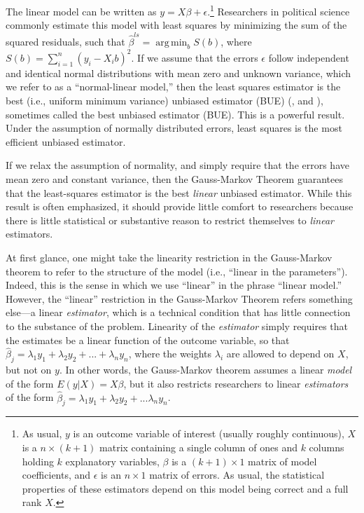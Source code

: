 \documentclass[12pt]{article}
\DeclareMathOperator*{\argmin}{arg\,min}
\begin{document}
The linear model can be written as $y = X\beta + \epsilon$.\footnote{As usual, $y$ is an outcome variable of interest (usually roughly continuous), $X$ is a $n \times (k + 1)$ matrix containing a single column of ones and $k$ columns holding $k$ explanatory variables, $\beta$ is a $(k + 1) \times 1$ matrix of model coefficients, and $\epsilon$ is an $n \times 1$ matrix of errors. As usual, the statistical properties of these estimators depend on this model being correct and a full rank $X$.} 
Researchers in political science commonly estimate this model with least squares by minimizing the sum of the squared residuals, such that $\hat{\beta}^{ls} = \argmin_b S(b)$, where $S(b) = \sum_{i = 1}^n(y_i - X_ib)^2$. 
If we assume that the errors $\epsilon$ follow independent and identical normal distributions with mean zero and unknown variance, which we refer to as a ``normal-linear model,'' then the least squares estimator is the best (i.e., uniform minimum variance) unbiased estimator (BUE) (\citealt[pp. 334-342]{CasellaBerger2002}, and \citealt[807-815]{Wooldridge2013}), sometimes called the best unbiased estimator (BUE).
This is a powerful result. 
Under the assumption of normally distributed errors, least squares is the most efficient unbiased estimator.

If we relax the assumption of normality, and simply require that the errors have mean zero and constant variance, then the Gauss-Markov Theorem guarantees that the least-squares estimator is the best \textit{linear} unbiased estimator. 
While this result is often emphasized, it should provide little comfort to researchers because there is little statistical or substantive reason to restrict themselves to \textit{linear} estimators.

At first glance, one might take the linearity restriction in the Gauss-Markov theorem to refer to the structure of the model (i.e., ``linear in the parameters''). 
Indeed, this is the sense in which we use ``linear'' in the phrase ``linear model.'' 
However, the ``linear'' restriction in the Gauss-Markov Theorem refers something else---a linear \textit{estimator}, which is a technical condition that has little connection to the substance of the problem.
Linearity of the \textit{estimator} simply requires that the estimates be a linear function of the outcome variable, so that $\hat{\beta}_j = \lambda_1 y_1 + \lambda_2 y_2 + ... + \lambda_n y_n$, where the weights $\lambda_i$ are allowed to depend on $X$, but not on $y$. 
In other words, the Gauss-Markov theorem assumes a linear \textit{model} of the form $E(y | X) = X\beta$, but it also restricts researchers to linear \textit{estimators} of the form $\hat{\beta}_j = \lambda_1 y_1 + \lambda_2 y_2 + ... \lambda_n y_n$. 
\end{document}
